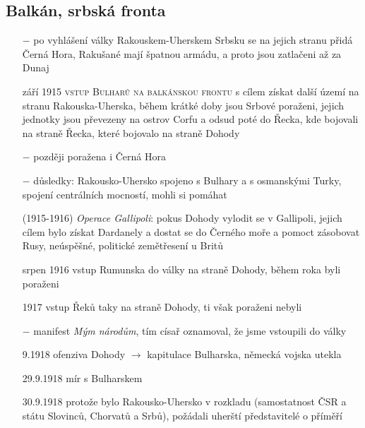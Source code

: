 \documentclass{article}
\begin{document}
\subsection*{Balkán, srbská fronta}
\begin{itemize}
    \vspace{-0.5em}
    \setlength\itemsep{0.15em}
    \item[$-$] po vyhlášení války Rakouskem-Uherskem Srbsku se na jejich stranu přidá Černá Hora, Rakušané mají špatnou armádu, a proto jsou zatlačeni až za Dunaj
    \item[září 1915] \textsc{vstup Bulharů na balkánskou frontu} s cílem získat další území na stranu Rakouska-Uherska, během krátké doby jsou Srbové poraženi, jejich jednotky jsou převezeny na ostrov Corfu a odsud poté do Řecka, kde bojovali na straně Řecka, které bojovalo na straně Dohody
    \item[$-$] později poražena i Černá Hora
    \item[$-$] důsledky: Rakousko-Uhersko  spojeno s Bulhary a s osmanskými Turky, spojení centrálních mocností, mohli si pomáhat
    \item[(1915-1916)] \textit{Operace Gallipoli}: pokus Dohody vylodit se v Gallipoli, jejich cílem bylo získat Dardanely a dostat se do Černého moře a pomoct zásobovat Rusy, neúspěšné, politické zemětřesení u Britů
    \item[srpen 1916] vstup Rumunska do války na straně Dohody, během roka byli poraženi
    \item[1917] vstup Řeků taky na straně Dohody, ti však poraženi nebyli
    \item[$-$] manifest \textit{Mým národům}, tím císař oznamoval, že jsme vstoupili do války
    \item[9.1918] ofenziva Dohody $\rightarrow$ kapitulace Bulharska, německá vojska utekla
    \item[29.9.1918] mír s Bulharskem
    \item[30.9.1918] protože bylo Rakousko-Uhersko v rozkladu (samostatnost ČSR a státu Slovinců, Chorvatů a Srbů), požádali uherští představitelé o příměří
\end{itemize}
\end{document}

